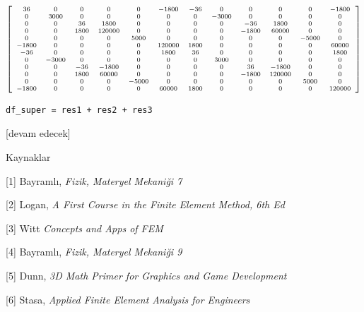 \documentclass[12pt,fleqn]{article}\usepackage{../../common}
\begin{document}
$$  
\scriptsize
\left[\begin{array}{cccccccccccc}36 & 0 & 0 & 0 & 0 & -1800 & -36 & 0 & 0 & 0 &
    0 & -1800\\0 & 3000 & 0 & 0 & 0 & 0 & 0 & -3000 & 0 & 0 & 0 & 0\\0 & 0 & 36
    & 1800 & 0 & 0 & 0 & 0 & -36 & 1800 & 0 & 0\\0 & 0 & 1800 & 120000 & 0 & 0 &
    0 & 0 & -1800 & 60000 & 0 & 0\\0 & 0 & 0 & 0 & 5000 & 0 & 0 & 0 & 0 & 0 &
    -5000 & 0\\-1800 & 0 & 0 & 0 & 0 & 120000 & 1800 & 0 & 0 & 0 & 0 &
    60000\\-36 & 0 & 0 & 0 & 0 & 1800 & 36 & 0 & 0 & 0 & 0 & 1800\\0 & -3000 & 0
    & 0 & 0 & 0 & 0 & 3000 & 0 & 0 & 0 & 0\\0 & 0 & -36 & -1800 & 0 & 0 & 0 & 0
    & 36 & -1800 & 0 & 0\\0 & 0 & 1800 & 60000 & 0 & 0 & 0 & 0 & -1800 & 120000
    & 0 & 0\\0 & 0 & 0 & 0 & -5000 & 0 & 0 & 0 & 0 & 0 & 5000 & 0\\-1800 & 0 & 0
    & 0 & 0 & 60000 & 1800 & 0 & 0 & 0 & 0 & 120000\end{array}\right]
$$

\begin{verbatim}
df_super = res1 + res2 + res3
\end{verbatim}










  
[devam edecek]

Kaynaklar

[1] Bayramlı, {\em Fizik, Materyel Mekaniği 7}

[2] Logan, {\em A First Course in the Finite Element Method, 6th Ed}

[3] Witt {\em Concepts and Apps of FEM}

[4] Bayramlı, {\em Fizik, Materyel Mekaniği 9}

[5] Dunn, {\em 3D Math Primer for Graphics and Game Development}

[6] Stasa, {\em Applied Finite Element Analysis for Engineers}
\end{document}
